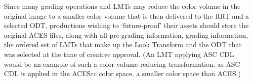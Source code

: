 Since many grading operations and LMTs may reduce the color volume in the original image to a smaller color volume that is then delivered to the RRT and a selected ODT, productions wishing to `future-proof' their assets should store the original ACES files, along with all pre-grading information, grading information, the ordered set of LMTs that make up the Look Transform and the ODT that was selected at the time of creative approval. (An LMT applying ASC CDL would be an example of such a color-volume-reducing transformation, as ASC CDL is applied in the ACEScc color space, a smaller color space than ACES.)